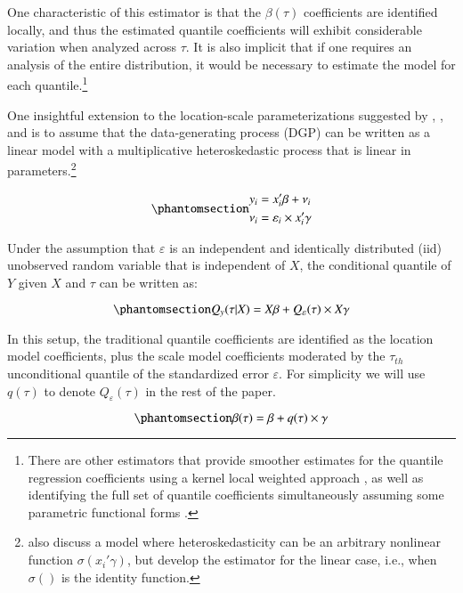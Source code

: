 \documentclass[
  authoryear,
  review,
  1p]{elsarticle}
\begin{document}
One characteristic of this estimator is that the \(\beta(\tau)\)
coefficients are identified locally, and thus the estimated quantile
coefficients will exhibit considerable variation when analyzed across
\(\tau\). It is also implicit that if one requires an analysis of the
entire distribution, it would be necessary to estimate the model for
each quantile.\footnote{There are other estimators that provide smoother
  estimates for the quantile regression coefficients using a kernel
  local weighted approach \citep{kaplan2017}, as well as identifying the
  full set of quantile coefficients simultaneously assuming some
  parametric functional forms \citep{frumentobotai2016}.}

One insightful extension to the location-scale parameterizations
suggested by \citet{he1997}, \citet{cameron2005}, and \citet{mss2019} is
to assume that the data-generating process (DGP) can be written as a
linear model with a multiplicative heteroskedastic process that is
linear in parameters.\footnote{\citet{mss2019} also discuss a model
  where heteroskedasticity can be an arbitrary nonlinear function
  \(\sigma(x_i'\gamma)\), but develop the estimator for the linear case,
  i.e., when \(\sigma()\) is the identity function.}

\begin{equation}\phantomsection\label{eq-eq4}{\begin{aligned}
y_i &=x_i'\beta+\nu_i \\
\nu_i &=\varepsilon_i \times x_i'\gamma 
\end{aligned}
}\end{equation}

Under the assumption that \(\varepsilon\) is an independent and
identically distributed (iid) unobserved random variable that is
independent of \(X\), the conditional quantile of \(Y\) given \(X\) and
\(\tau\) can be written as:

\begin{equation}\phantomsection\label{eq-eq5}{Q_y(\tau|X) =X\beta+Q_\varepsilon(\tau) \times X\gamma 
}\end{equation}

In this setup, the traditional quantile coefficients are identified as
the location model coefficients, plus the scale model coefficients
moderated by the \(\tau_{th}\) unconditional quantile of the
standardized error \(\varepsilon\). For simplicity we will use
\(q(\tau)\) to denote \(Q_\varepsilon(\tau)\) in the rest of the paper.

\begin{equation}\phantomsection\label{eq-eq6}{\beta(\tau) = \beta + q(\tau) \times \gamma 
}\end{equation}
\end{document}
